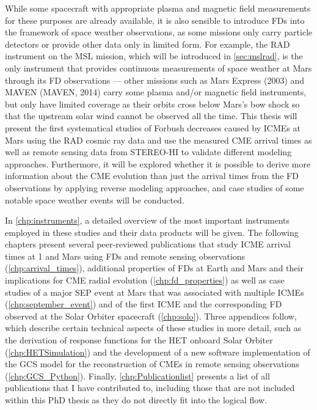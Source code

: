 While some spacecraft with appropriate plasma and magnetic field measurements for these purposes are already available, it is also sensible to introduce \acp{FD} into the framework of space weather observations, as some missions only carry particle detectors or provide other data only in limited form. For example, the \ac{RAD} instrument on the \ac{MSL} mission, which will be introduced in \autoref{sec:mslrad}, is the only instrument that provides continuous measurements of space weather at Mars through its \ac{FD} observations --- other missions such as Mars Express (2003) and \acl{MAVEN} (\acs{MAVEN}, 2014) carry some plasma and/or magnetic field instruments, but only have limited coverage as their orbits cross below Mars's bow shock so that the upstream solar wind cannot be observed all the time. This thesis will present the first systematical studies of Forbush decreases caused by \acp{ICME} at Mars using the \ac{RAD} cosmic ray data and use the measured \ac{CME} arrival times as well as remote sensing data from \ac{STEREO}-\ac{HI} to validate different modeling approaches. Furthermore, it will be explored whether it is possible to derive more information about the \ac{CME} evolution than just the arrival times from the \ac{FD} observations by applying reverse modeling approaches, and case studies of some notable space weather events will be conducted.

In \autoref{chp:instruments}, a detailed overview of the most important instruments employed in these studies and their data products will be given. The following chapters present several peer-reviewed publications that study \ac{ICME} arrival times at \SI{1}{\AU} and Mars using \acp{FD} and remote sensing observations (\autoref{chp:arrival_times}), additional properties of \acp{FD} at Earth and Mars and their implications for \ac{CME} radial evolution (\autoref{chp:fd_properties}) as well as case studies of a major \ac{SEP} event at Mars that was associated with multiple \acp{ICME} (\autoref{chp:september_event}) and of the first \ac{ICME} and the corresponding \ac{FD} observed at the Solar Orbiter spacecraft (\autoref{chp:solo}). Three appendices follow, which describe certain technical aspects of these studies in more detail, such as the derivation of response functions for the \ac{HET} onboard Solar Orbiter (\autoref{chp:HETSimulation}) and the development of a new software implementation of the \ac{GCS} model for the reconstruction of \acp{CME} in remote sensing observations (\autoref{chp:GCS_Python}). Finally, \autoref{chp:Publicationlist} presents a list of all publications that I have contributed to, including those that are not included within this PhD thesis as they do not directly fit into the logical flow.
